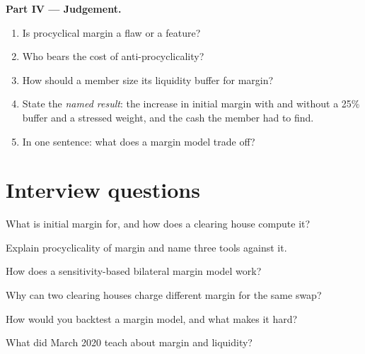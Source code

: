 \begin{problem}
\medskip\noindent\textbf{Part IV --- Judgement.}
\begin{enumerate}[resume]
\item Is procyclical margin a flaw or a feature?
\item Who bears the cost of anti-procyclicality?
\item How should a member size its liquidity buffer for margin?
\item State the \emph{named result}: the increase in initial margin with and without a 25\% buffer and a
stressed weight, and the cash the member had to find.
\item In one sentence: what does a margin model trade off?
\end{enumerate}
\end{problem}

\section{Interview questions}

\begin{interviewq}\label{iq:rc:margin-models:1}
What is initial margin for, and how does a clearing house compute it?
\end{interviewq}

\begin{interviewq}\label{iq:rc:margin-models:2}
Explain procyclicality of margin and name three tools against it.
\end{interviewq}

\begin{interviewq}\label{iq:rc:margin-models:3}
How does a sensitivity-based bilateral margin model work?
\end{interviewq}

\begin{interviewq}\label{iq:rc:margin-models:4}
Why can two clearing houses charge different margin for the same swap?
\end{interviewq}

\begin{interviewq}\label{iq:rc:margin-models:5}
How would you backtest a margin model, and what makes it hard?
\end{interviewq}

\begin{interviewq}\label{iq:rc:margin-models:6}
What did March 2020 teach about margin and liquidity?
\end{interviewq}
